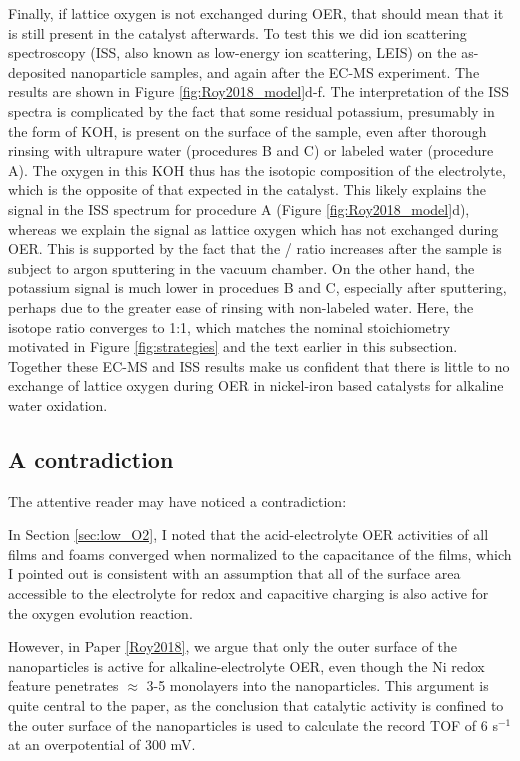 Finally, if lattice oxygen is not exchanged during OER, that should mean that it is still present in the catalyst afterwards. To test this we did ion scattering spectroscopy (ISS, also known as low-energy ion scattering, LEIS) on the as-deposited nanoparticle samples, and again after the EC-MS experiment. The results are shown in Figure \ref{fig:Roy2018_model}d-f. The interpretation of the ISS spectra is complicated by the fact that some residual potassium, presumably in the form of KOH, is present on the surface of the sample, even after thorough rinsing with ultrapure water (procedures B and C) or labeled water (procedure A). The oxygen in this KOH thus has the isotopic composition of the electrolyte, which is the opposite of that expected in the catalyst. This likely explains the  signal in the ISS spectrum for procedure A (Figure \ref{fig:Roy2018_model}d), whereas we explain the  signal as lattice oxygen which has not exchanged during OER. This is supported by the fact that the / ratio increases after the sample is subject to argon sputtering in the vacuum chamber. On the other hand, the potassium signal is much lower in procedues B and C, especially after sputtering, perhaps due to the greater ease of rinsing with non-labeled water. Here, the isotope ratio converges to 1:1, which matches the nominal stoichiometry motivated in Figure \ref{fig:strategies} and the text earlier in this subsection. Together these EC-MS and ISS results make us confident that there is little to no exchange of lattice oxygen during OER in nickel-iron based catalysts for alkaline water oxidation.

\clearpage 
\subsection{A contradiction}

The attentive reader may have noticed a contradiction:

In Section \ref{sec:low_O2}, I noted that the acid-electrolyte OER activities of all  films and  foams converged when normalized to the capacitance of the films, which I pointed out is consistent with an assumption that all of the surface area accessible to the electrolyte for redox and capacitive charging is also active for the oxygen evolution reaction. 

However, in Paper \ref{Roy2018}, we argue that only the outer surface of the nanoparticles is active for alkaline-electrolyte OER, even though the Ni redox feature penetrates $\approx$ 3-5 monolayers into the nanoparticles. This argument is quite central to the paper, as the conclusion that catalytic activity is confined to the outer surface of the nanoparticles is used to calculate the record TOF of 6 s$^{-1}$ at an overpotential of 300 mV. 

